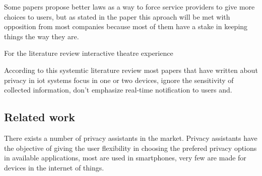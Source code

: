 \documentclass[conference]{IEEEtran}
\begin{document}
Some papers propose better laws \cite{} as a way to force service providers
to give more choices to users, but as stated in the paper this
aproach will be met with opposition from most companies because
most of them have a stake in keeping things the way they are.

For the literature review interactive theatre experience \cite{SkirpanPrivacy}

According to this systemtic literature review \cite{Gupta2022Privacy} most papers
that have written about privacy in iot systems focus in one or two devices,
ignore the sensitivity of collected information, don't emphasize real-time
notification to users and.

\subsection{Related work}

There exists a number of privacy assistants in the market. Privacy assistants
have the objective of giving the user flexibility in choosing the
prefered privacy options in available applications, most are used in
smartphones, very few are made for devices in the internet of things.
\end{document}
